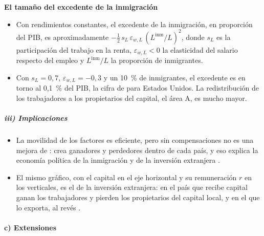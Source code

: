 \documentclass[11pt]{article}
\begin{document}
\begin{anotaciones}
\textbf{El tamaño del excedente de la inmigración}
\begin{itemize}
\item Con rendimientos constantes, el excedente de la inmigración, en proporción del PIB, es aproximadamente $-\tfrac12\,s_L\,\varepsilon_{w,L}\,(L^{\mathrm{inm}}/L)^2$, donde $s_L$ es la participación del trabajo en la renta, $\varepsilon_{w,L}<0$ la elasticidad del salario respecto del empleo y $L^{\mathrm{inm}}/L$ la proporción de inmigrantes\nocite{Borjas1995Benefits}.
\item Con $s_L=0{,}7$, $\varepsilon_{w,L}=-0{,}3$ y un 10~\% de inmigrantes, el excedente es en torno al 0,1~\% del PIB, la cifra de  para Estados Unidos. La redistribución de los trabajadores a los propietarios del capital, el área A, es mucho mayor.
\end{itemize}
\end{anotaciones}

\subparagraph{iii) Implicaciones}

\begin{itemize}
\item La movilidad de los factores es eficiente, pero sin compensaciones no es una mejora de : crea ganadores y perdedores dentro de cada país, y eso explica la economía política de la inmigración y de la inversión extranjera .
\item El mismo gráfico, con el capital en el eje horizontal y su remuneración $r$ en los verticales, es el de la inversión extranjera: en el país que recibe capital ganan los trabajadores y pierden los propietarios del capital local, y en el que lo exporta, al revés .
\end{itemize}

\paragraph{c) Extensiones}
\end{document}
